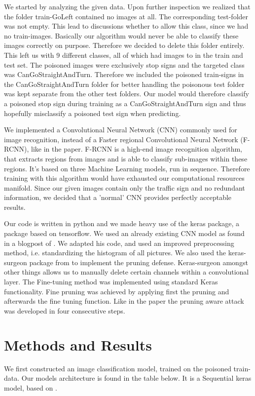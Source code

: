 \documentclass[a4paper,12pt]{report}
\begin{document}
We started by analyzing the given data. Upon further inspection we realized that the folder train-GoLeft contained no images at all. The corresponding test-folder was not empty. This lead to discussions whether to allow this class, since we had no train-images. Basically our algorithm would never be able to classify these images correctly on purpose. Therefore we decided to delete this folder entirely. This left us with 9 different classes, all of which had images to in the train and test set. The poisoned images were exclusively stop signs and the targeted class was CanGoStraightAndTurn. Therefore we included the poisoned train-signs in the CanGoStraightAndTurn folder for better handling the poisonous test folder was kept separate from the other test folders. Our model would therefore classify a poisoned stop sign during training as a CanGoStraightAndTurn sign and thus hopefully misclassify a poisoned test sign when predicting. 

We implemented a Convolutional Neural Network (CNN) commonly used for image recognition, instead of a Faster regional Convolutional Neural Network (F-RCNN), like in the paper. F-RCNN is a high-end image recognition algorithm, that extracts regions from images and is able to classify sub-images within these regions. It's based on three Machine Learning models, run in sequence. Therefore training with this algorithm would have exhausted our computational resources manifold. Since our given images contain only the traffic sign and no redundant information, we decided that a 'normal' CNN provides perfectly acceptable results.

Our code is written in python and we made heavy use of the keras package, a package based on tensorflow. We used an already existing CNN model as found in a blogpost of \citep{architecture}. We adapted his code, and used an improved preprocessing method, i.e. standardizing the histogram of all pictures. We also used the keras-surgeon package from \citep{surgeon} to implement the pruning defense.  Keras-surgeon amongst other things allows us to manually delete certain channels within a convolutional layer. The Fine-tuning method was implemented using standard Keras functionality. Fine pruning was achieved by applying first the pruning and afterwards the fine tuning function. Like in the paper the pruning aware attack was developed in four consecutive steps.




\chapter{Methods and Results}
We first constructed an image classification model, trained on the poisoned train-data. Our models architecture is found in the table below. It is a Sequential keras model, based on \citep{architecture}.
\end{document}
